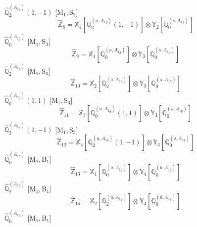 \documentclass[fleqn,10pt,landscape]{article}
\begin{document}
\begin{itemize}
\noindent {} $\,\,\,\hat{\mathbb{Q}}_{2}^{(A_{1g})}(1,-1)$ [M$_{1}$,\,S$_{2}$]
\begin{dmath*}
\hat{\mathbb{Z}}_{8}=\mathbb{X}_{4}[\mathbb{Q}_{2}^{(a,A_{1g})}(1,-1)] \otimes\mathbb{Y}_{2}[\mathbb{Q}_{0}^{(s,A_{1g})}]
\end{dmath*}
\vspace{4mm}
\noindent {} $\,\,\,\hat{\mathbb{Q}}_{0}^{(A_{1g})}$ [M$_{1}$,\,S$_{3}$]
\begin{dmath*}
\hat{\mathbb{Z}}_{9}=\mathbb{X}_{1}[\mathbb{Q}_{0}^{(a,A_{1g})}] \otimes\mathbb{Y}_{3}[\mathbb{Q}_{0}^{(s,A_{1g})}]
\end{dmath*}
\vspace{4mm}
\noindent {} $\,\,\,\hat{\mathbb{Q}}_{2}^{(A_{1g})}$ [M$_{1}$,\,S$_{3}$]
\begin{dmath*}
\hat{\mathbb{Z}}_{10}=\mathbb{X}_{2}[\mathbb{Q}_{2}^{(a,A_{1g})}] \otimes\mathbb{Y}_{3}[\mathbb{Q}_{0}^{(s,A_{1g})}]
\end{dmath*}
\vspace{4mm}
\noindent {} $\,\,\,\hat{\mathbb{Q}}_{0}^{(A_{1g})}(1,1)$ [M$_{1}$,\,S$_{3}$]
\begin{dmath*}
\hat{\mathbb{Z}}_{11}=\mathbb{X}_{3}[\mathbb{Q}_{0}^{(a,A_{1g})}(1,1)] \otimes\mathbb{Y}_{3}[\mathbb{Q}_{0}^{(s,A_{1g})}]
\end{dmath*}
\vspace{4mm}
\noindent {} $\,\,\,\hat{\mathbb{Q}}_{2}^{(A_{1g})}(1,-1)$ [M$_{1}$,\,S$_{3}$]
\begin{dmath*}
\hat{\mathbb{Z}}_{12}=\mathbb{X}_{4}[\mathbb{Q}_{2}^{(a,A_{1g})}(1,-1)] \otimes\mathbb{Y}_{3}[\mathbb{Q}_{0}^{(s,A_{1g})}]
\end{dmath*}
\vspace{4mm}
\noindent {} $\,\,\,\hat{\mathbb{Q}}_{0}^{(A_{1g})}$ [M$_{1}$,\,B$_{1}$]
\begin{dmath*}
\hat{\mathbb{Z}}_{13}=\mathbb{X}_{1}[\mathbb{Q}_{0}^{(a,A_{1g})}] \otimes\mathbb{Y}_{4}[\mathbb{Q}_{0}^{(b,A_{1g})}]
\end{dmath*}
\vspace{4mm}
\noindent {} $\,\,\,\hat{\mathbb{Q}}_{2}^{(A_{1g})}$ [M$_{1}$,\,B$_{1}$]
\begin{dmath*}
\hat{\mathbb{Z}}_{14}=\mathbb{X}_{2}[\mathbb{Q}_{2}^{(a,A_{1g})}] \otimes\mathbb{Y}_{4}[\mathbb{Q}_{0}^{(b,A_{1g})}]
\end{dmath*}
\vspace{4mm}
\noindent {} $\,\,\,\hat{\mathbb{Q}}_{0}^{(A_{1g})}$ [M$_{1}$,\,B$_{1}$]

\end{itemize}
\end{document}
